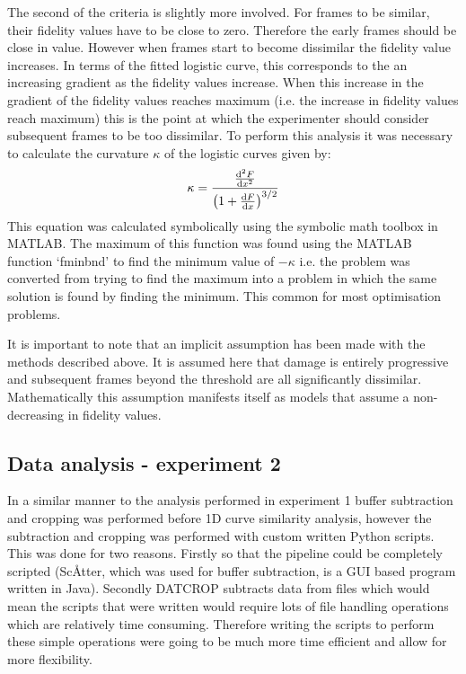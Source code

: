 The second of the criteria is slightly more involved. For frames to be similar, their fidelity values have to be close to zero.
Therefore the early frames should be close in value.
However when frames start to become dissimilar the fidelity value increases.
In terms of the fitted logistic curve, this corresponds to the an increasing gradient as the fidelity values increase.
When this increase in the gradient of the fidelity values reaches maximum (i.e. the increase in fidelity values reach maximum) this is the point at which the experimenter should consider subsequent frames to be too dissimilar.
To perform this analysis it was necessary to calculate the curvature $\kappa$ of the logistic curves given by:
\begin{equation}
    \kappa = \frac{\frac{\mathrm{d}^2F}{\mathrm{d}x^2}}{\left( 1 + \frac{\mathrm{d}F}{\mathrm{d}x}\right)^{3/2}}
    \label{eq:Curvature}
\end{equation}
This equation was calculated symbolically using the symbolic math toolbox in MATLAB. The maximum of this function was found using the MATLAB function `fminbnd' to find the minimum value of $-\kappa$ i.e. the problem was converted from trying to find the maximum into a problem in which the same solution is found by finding the minimum. This common for most optimisation problems.

It is important to note that an implicit assumption has been made with the methods described above.
It is assumed here that damage is entirely progressive and subsequent frames beyond the threshold are all significantly dissimilar.
Mathematically this assumption manifests itself as models that assume a non-decreasing in fidelity values.

\subsection{Data analysis - experiment 2}
\label{sub:Data analysis - experiment 2}
In a similar manner to the analysis performed in experiment 1 buffer subtraction and cropping was performed before 1D curve similarity analysis, however the subtraction and cropping was performed with custom written Python scripts.
This was done for two reasons.
Firstly so that the pipeline could be completely scripted (Sc\AA tter, which was used for buffer subtraction, is a GUI based program written in Java).
Secondly DATCROP subtracts data from files which would mean the scripts that were written would require lots of file handling operations which are relatively time consuming.
Therefore writing the scripts to perform these simple operations were going to be much more time efficient and allow for more flexibility.

